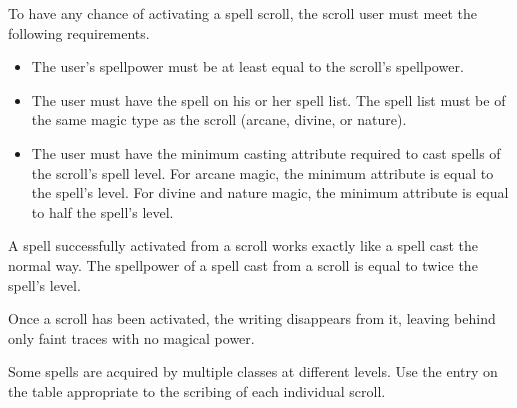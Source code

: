             To have any chance of activating a spell scroll, the scroll user must meet the following requirements.
            \begin{itemize}
                \item The user's spellpower must be at least equal to the scroll's spellpower.
                \item The user must have the spell on his or her spell list.
                    The spell list must be of the same magic type as the scroll (arcane, divine, or nature).
                \item The user must have the minimum casting attribute required to cast spells of the scroll's spell level.
                    For arcane magic, the minimum attribute is equal to the spell's level.
                    For divine and nature magic, the minimum attribute is equal to half the spell's level.
            \end{itemize}

             A spell successfully activated from a scroll works exactly like a spell cast the normal way.
            The spellpower of a spell cast from a scroll is equal to twice the spell's level.

            Once a scroll has been activated, the writing disappears from it, leaving behind only faint traces with no magical power.

             Some spells are acquired by multiple classes at different levels.
            Use the entry on the table appropriate to the scribing of each individual scroll.

